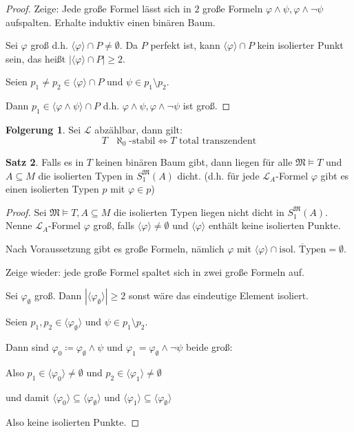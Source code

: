 \documentclass[12pt,parskip=full]{scrartcl}
\newcommand{\abs}[1]{{\left| #1 \right|}}
\theoremstyle{definition}
\newtheorem{theorem}{Satz}[section]
\newtheorem{corollary}[theorem]{Folgerung}
\begin{document}
\begin{proof}
		Zeige: Jede große Formel lässt sich in $2$ große Formeln $\varphi \land \psi, \varphi \land \lnot \psi$ aufspalten. Erhalte induktiv einen binären Baum.
		
		Sei $\varphi$ groß d.h. $\langle \varphi \rangle \cap P \neq \emptyset$. Da $P$ perfekt ist, kann $\langle \varphi \rangle \cap P$ kein isolierter Punkt sein, das heißt $\abs{\langle \varphi \rangle \cap P} \geq 2$.
		
		Seien $p_1 \neq p_2 \in \langle \varphi \rangle \cap P$ und $\psi \in p_1 \setminus p_2$.
		
		Dann $p_1 \in \langle \varphi \land \psi \rangle \cap P$ d.h. $\varphi \land \psi, \varphi \land \lnot \psi$ ist groß.
 	\end{proof}
 
 	\begin{corollary}
 		Sei $\mathcal{L}$ abzählbar, dann gilt:
 		\begin{equation*}
	 		\text{$T$ $\aleph_0$-stabil} \Leftrightarrow \text{$T$ total transzendent}
 		\end{equation*}
 	\end{corollary}
 
 	\begin{theorem}
 		Falls es in $T$ keinen binären Baum gibt, dann liegen für alle $\mathfrak{M} \models T$ und $A \subseteq M$ die isolierten Typen in $S_1^\mathfrak{M}(A)$ dicht. (d.h. für jede $\mathcal{L}_A$-Formel $\varphi$ gibt es einen isolierten Typen $p$ mit $\varphi \in p$)
 	\end{theorem}
 
 	\begin{proof}
 		Sei $\mathfrak{M} \models T, A \subseteq M$ die isolierten Typen liegen nicht dicht in $S_1^\mathfrak{M}(A)$. Nenne $\mathcal{L}_A$-Formel $\varphi$ groß, falls $\langle \varphi \rangle \neq \emptyset$ und $\langle \varphi \rangle$ enthält keine isolierten Punkte.
 		
 		Nach Voraussetzung gibt es große Formeln, nämlich $\varphi$ mit $\langle \varphi \rangle \cap \overline{\text{isol. Typen}} = \emptyset$.
 		
 		Zeige wieder: jede große Formel spaltet sich in zwei große Formeln auf.
 		
 		Sei $\varphi_\emptyset$ groß. Dann $\abs{\langle \varphi_\emptyset \rangle} \geq 2$ sonst wäre das eindeutige Element isoliert.
 		
 		Seien $p_1, p_2 \in \langle \varphi_\emptyset \rangle$ und $\psi \in p_1 \setminus p_2$.
 		
 		Dann sind $\varphi_0 \coloneqq \varphi_\emptyset \land \psi$ und $\varphi_1 = \varphi_\emptyset \land \lnot \psi$ beide groß:
 		
 		Also $p_1 \in \langle \varphi_0 \rangle \neq \emptyset$ und $p_2 \in \langle \varphi_1 \rangle \neq \emptyset$
 		
 		und damit $\langle \varphi_0 \rangle \subseteq \langle \varphi_\emptyset \rangle$ und $\langle \varphi_1 \rangle \subseteq \langle \varphi_\emptyset \rangle$
 		
 		Also keine isolierten Punkte.
 	\end{proof}
 
\end{document}
